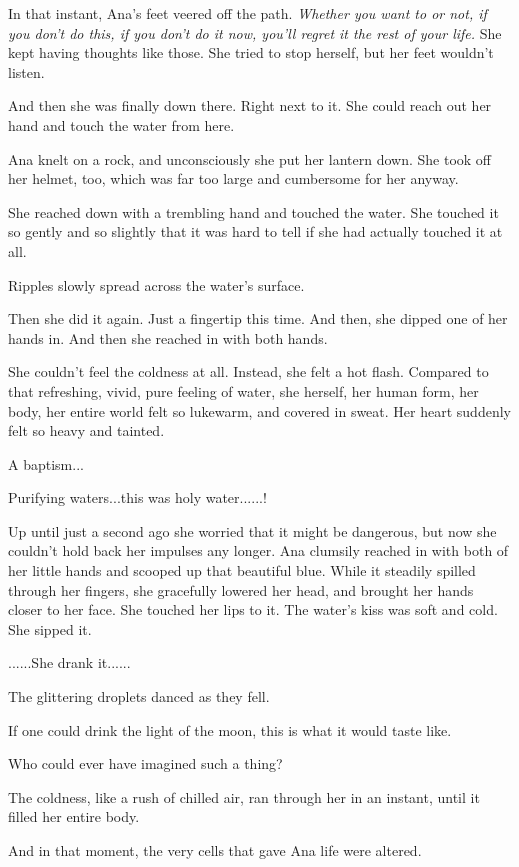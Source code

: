 \documentclass[
]{article}
\begin{document}
In that instant, Ana's feet veered off the path. \emph{Whether you want
to or not, if you don't do this, if you don't do it now, you'll regret
it the rest of your life.} She kept having thoughts like those. She
tried to stop herself, but her feet wouldn't listen.

And then she was finally down there. Right next to it. She could reach
out her hand and touch the water from here.

Ana knelt on a rock, and unconsciously she put her lantern down. She
took off her helmet, too, which was far too large and cumbersome for her
anyway.

She reached down with a trembling hand and touched the water. She
touched it so gently and so slightly that it was hard to tell if she had
actually touched it at all.

Ripples slowly spread across the water's surface.

Then she did it again. Just a fingertip this time. And then, she dipped
one of her hands in. And then she reached in with both hands.

She couldn't feel the coldness at all. Instead, she felt a hot flash.
Compared to that refreshing, vivid, pure feeling of water, she herself,
her human form, her body, her entire world felt so lukewarm, and covered
in sweat. Her heart suddenly felt so heavy and tainted.

A baptism...

Purifying waters...this was holy water......!

Up until just a second ago she worried that it might be dangerous, but
now she couldn't hold back her impulses any longer. Ana clumsily reached
in with both of her little hands and scooped up that beautiful blue.
While it steadily spilled through her fingers, she gracefully lowered
her head, and brought her hands closer to her face. She touched her lips
to it. The water's kiss was soft and cold. She sipped it.

......She drank it......

The glittering droplets danced as they fell.

If one could drink the light of the moon, this is what it would taste
like.

Who could ever have imagined such a thing?

The coldness, like a rush of chilled air, ran through her in an instant,
until it filled her entire body.

And in that moment, the very cells that gave Ana life were altered.
\end{document}
